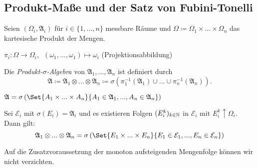 \documentclass{cheat-sheet}
\newcommand{\Alg}{\mathfrak{A}} %
\begin{document}

\subsection{Produkt-Maße und der Satz von Fubini-Tonelli}


\begin{voraussetzung}
  Seien $(\Omega_i, \Alg_i)$ für $i \in \{ 1, ..., n \}$ messbare Räume und $\Omega \coloneqq \Omega_1 \times ... \times \Omega_n$ das kartesische Produkt der Mengen.
\end{voraussetzung}

\begin{nota}
  $\pi_i : \Omega \to \Omega_i, \enspace (\omega_1, ..., \omega_1) \mapsto \omega_i$ (Projektionsabbildung)
\end{nota}

\begin{defn}
  Die \emph{Produkt-$\sigma$-Algebra} von $\Alg_1, ..., \Alg_n$ ist definiert durch
  \[ \Alg \coloneqq \Alg_1 \otimes ... \otimes \Alg_n \coloneqq \sigma \left( \pi_1^{-1}(\Alg_1) \cup ... \cup \pi_n^{-1}(\Alg_n) \right). \]
\end{defn}

\begin{satz}
  $\Alg = \sigma \left( \Set{ A_1 \times ... \times A_n }{ A_1 \in \Alg_1, ..., A_n \in \Alg_n } \right)$
\end{satz}

\begin{lem}
  Sei $\mathcal{E}_i$ mit $\sigma(E_i) = \Alg_i$ und es existieren Folgen $(E_i^k)_{k \in \mathbb{N}}$ in $\mathcal{E}_i$ mit $E_i^k \uparrow \Omega_i$. Dann gilt:
  \[ \Alg_1 \otimes ... \otimes \Alg_n = \sigma \left( \Set{ E_1 \times ... \times E_n }{ E_1 \in \mathcal{E}_1, ..., E_n \in \mathcal{E}_n } \right) \]
\end{lem}


\begin{bem}
  Auf die Zusatzvoraussetzung der monoton aufsteigenden Mengenfolge können wir nicht verzichten.
\end{bem}
\end{document}

